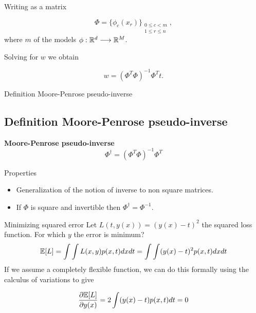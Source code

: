   \begin{frame}
    Writing as a matrix 
  
    \begin{equation}
      \Phi = \{ \phi_c(x_r)\}_{
          \substack{ 
            0 \leq c < m\\
            1 \leq r \leq n
          }
      },
    \end{equation}
    where $m$ of the models $\phi: \mathbb{R}^d \longrightarrow \mathbb{R}^M$. 
  
    Solving for $w$ we obtain 
  
    \begin{equation}
      w = 
      \left(
        \Phi^T \Phi
      \right)^{-1}
      \Phi^T t.
    \end{equation}
    
  \end{frame}
  
  \begin{frame}{Definition Moore-Penrose pseudo-inverse}
    \subsection{Definition Moore-Penrose pseudo-inverse}
    \begin{definition}
      \textbf{Moore-Penrose pseudo-inverse}
    \begin{equation}
      \Phi^\dagger 
      = 
      \left(
        \Phi^T \Phi
      \right)^{-1}
      \Phi^T
    \end{equation}
  \end{definition}
    Properties
    \begin{itemize}
      \item Generalization of the notion of inverse to non square matrices.
      \item If $\Phi$ is square and invertible then $\Phi^\dagger =  \Phi^{-1}$. 
    \end{itemize}
  \end{frame}
\begin{frame}{Minimizing squared error}
    Let $L(t, y(x)) = (y(x)-t)^2$ the squared loss function. 
    For which $y$ the error is minimum?
    \begin{equation}
       \mathbb{E} [L] = 
       \int \int 
       L(x,y ) p(x,t)
       dx dt 
       = 
       \int \int 
       (y(x)-t)^2 p(x,t)
       dx dt
    \end{equation}
    If we assume a completely flexible function, we can do this formally using the calculus of variations to give

    \begin{equation}
        \frac{\partial \mathbb{E}[L]}{\partial y(x)}
        = 
        2 \int 
            (y(x)-t)p(x,t) dt
        = 0
    \end{equation}
\end{frame}


